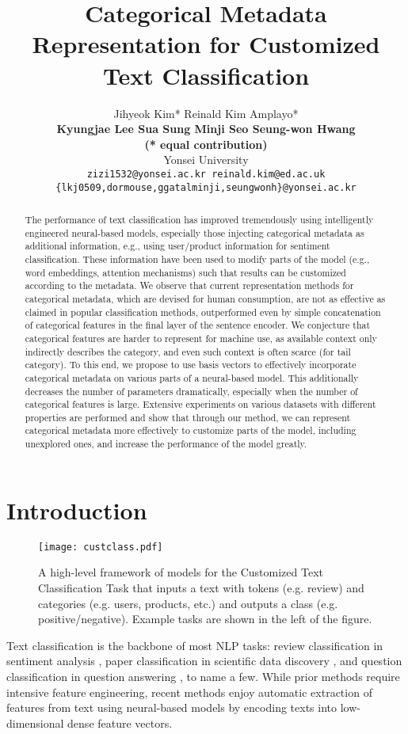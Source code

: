 \documentclass[11pt,a4paper]{article}
\title{Categorical Metadata Representation for Customized Text Classification}
\author{Jihyeok Kim* \quad
  Reinald Kim Amplayo* \\
  {\bf Kyungjae Lee \quad
  Sua Sung \quad
  Minji Seo \quad
  Seung-won Hwang} \\
  \textbf{(* equal contribution)} \\
  {Yonsei University} \quad {University of Edinburgh} \\
  {\small \tt zizi1532@yonsei.ac.kr \quad reinald.kim@ed.ac.uk} \\
  {\small \tt \{lkj0509,dormouse,ggatalminji,seungwonh\}@yonsei.ac.kr} \\
}
\begin{document}
\maketitle
\begin{abstract}
  The performance of text classification has improved tremendously using intelligently engineered neural-based models, especially those injecting categorical metadata as additional information, e.g., using user/product information for sentiment classification. These information have been used to modify parts of the model (e.g., word embeddings, attention mechanisms) such that results can be customized according to the metadata. We observe that current representation methods for categorical metadata, which are devised for human consumption, are not as effective as claimed in popular classification methods, outperformed even by simple concatenation of categorical features in the final layer of the sentence encoder. We conjecture that categorical features are harder to 
  represent for machine use, as available context only indirectly describes the category, and even such context is often scarce (for tail category).
  To this end, we propose to use basis vectors to effectively incorporate categorical metadata on various parts of a neural-based model. This additionally decreases the number of parameters dramatically, especially when the number of categorical features is large. Extensive experiments on various datasets with different properties are performed and show that through our method, we can represent categorical metadata more effectively to customize parts of the model, including unexplored ones, and increase the performance of the model greatly.
\end{abstract}

\section{Introduction}

\begin{figure}
    \centering
    \texttt{[image: custclass.pdf]}
    \caption{A high-level framework of models for the Customized Text Classification Task that inputs a text with  tokens (e.g. review) and  categories (e.g. users, products, etc.) and outputs a class (e.g. positive/negative). Example tasks are shown in the left of the figure.}
    \label{fig:custclass}
\end{figure}

Text classification is the backbone of most NLP tasks: review classification in sentiment analysis \cite{pang2002thumbs}, paper classification in scientific data discovery \cite{sebastiani2002machine}, and question classification in question answering \cite{li2002learning}, to name a few. While prior methods require intensive feature engineering, recent methods enjoy automatic extraction of features from text using neural-based models \cite{socher2011semi} by encoding texts into low-dimensional dense feature vectors.
\end{document}
